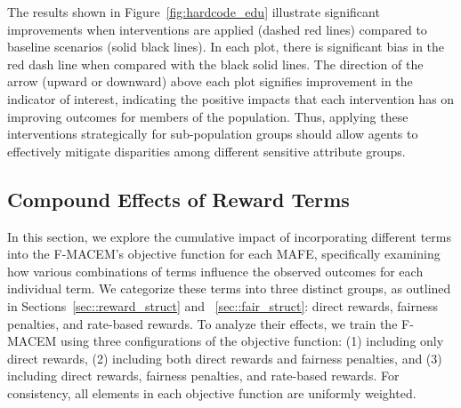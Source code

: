 The results shown in Figure~\ref{fig:hardcode_edu} illustrate significant improvements when interventions are applied (dashed red lines) compared to baseline scenarios (solid black lines). In each plot, there is significant bias in the red dash line when compared with the black solid lines. The direction of the arrow (upward or downward) above each plot signifies improvement in the indicator of interest, indicating the positive impacts that each intervention has on improving outcomes for members of the population.  Thus, applying these interventions strategically for sub-population groups should allow agents to effectively mitigate disparities among different sensitive attribute groups.

\vspace{-2mm}
\subsection{Compound Effects of Reward Terms}
\label{exp::learnability}

In this section, we explore the cumulative impact of incorporating different terms into the F-MACEM's objective function for each MAFE, specifically examining how various combinations of terms influence the observed outcomes for each individual term. We categorize these terms into three distinct groups, as outlined in Sections~\ref{sec::reward_struct} and ~\ref{sec::fair_struct}: direct rewards, fairness penalties, and rate-based rewards. To analyze their effects, we train the F-MACEM using three configurations of the objective function: (1) including only direct rewards, (2) including both direct rewards and fairness penalties, and (3) including direct rewards, fairness penalties, and rate-based rewards. For consistency, all elements in each objective function are uniformly weighted.

